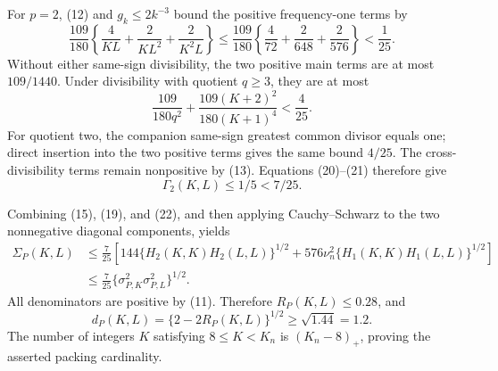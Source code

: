 For \(p=2\), (12) and \(g_k\leq2k^{-3}\) bound the positive frequency-one terms by
\[
 \frac{109}{180}\left\{\frac4{KL}+\frac2{KL^2}+\frac2{K^2L}\right\}
 \leq\frac{109}{180}\left\{\frac4{72}+\frac2{648}+\frac2{576}\right\}<\frac1{25}. \tag{20}
\]
Without either same-sign divisibility, the two positive main terms are at most \(109/1440\).  Under divisibility with quotient \(q\geq3\), they are at most
\[
 \frac{109}{180q^2}+\frac{109(K+2)^2}{180(K+1)^4}<\frac4{25}.                   \tag{21}
\]
For quotient two, the companion same-sign greatest common divisor equals one; direct insertion into the two positive terms gives the same bound \(4/25\).  The cross-divisibility terms remain nonpositive by (13).  Equations (20)--(21) therefore give
\[
 \Gamma_2(K,L)\leq1/5<7/25.                                                     \tag{22}
\]

Combining (15), (19), and (22), and then applying Cauchy--Schwarz to the two nonnegative diagonal components, yields
\[
 \begin{aligned}
 \Sigma_P(K,L)
 &\leq\frac7{25}\left[144\{H_2(K,K)H_2(L,L)\}^{1/2}
 +576\nu_n^2\{H_1(K,K)H_1(L,L)\}^{1/2}\right]\\
 &\leq\frac7{25}\{\sigma_{P,K}^2\sigma_{P,L}^2\}^{1/2}.
 \end{aligned}                                                                    \tag{23}
\]
All denominators are positive by (11).  Therefore \(R_P(K,L)\leq0.28\), and
\[
 d_P(K,L)=\{2-2R_P(K,L)\}^{1/2}\geq\sqrt{1.44}=1.2.                            \tag{24}
\]
The number of integers \(K\) satisfying \(8\leq K<K_n\) is \((K_n-8)_+\), proving the asserted packing cardinality.

